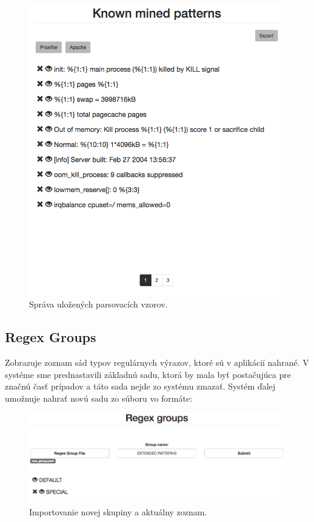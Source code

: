 \begin{figure}[htbp]
 \centering 
 \begin{minipage}{0.95\linewidth}
 	\centering
 	\includegraphics[width=\textwidth]{Images/thesis-pattern.png}
 \end{minipage}
  \caption{Správa uložených parsovacích vzorov.}
  \label{fig:pattern}
\end{figure}

\subsection{Regex Groups}
Zobrazuje zoznam sád typov regulárnych výrazov, ktoré sú v aplikácií nahrané. V systéme sme prednastavili základnú sadu, ktorá by mala byť postačujúca pre značnú časť prípadov a táto sada nejde zo systému zmazať. Systém ďalej umožnuje nahrať novú sadu zo súboru vo formáte:

 \begin{figure}[htbp]
 \centering 
 \begin{minipage}{0.95\linewidth}
 	\centering
 	\includegraphics[width=\textwidth]{Images/thesis-groups.png}
 \end{minipage}
  \caption{Importovanie novej skupiny a aktuálny zoznam.}
  \label{fig:groups}
\end{figure}
